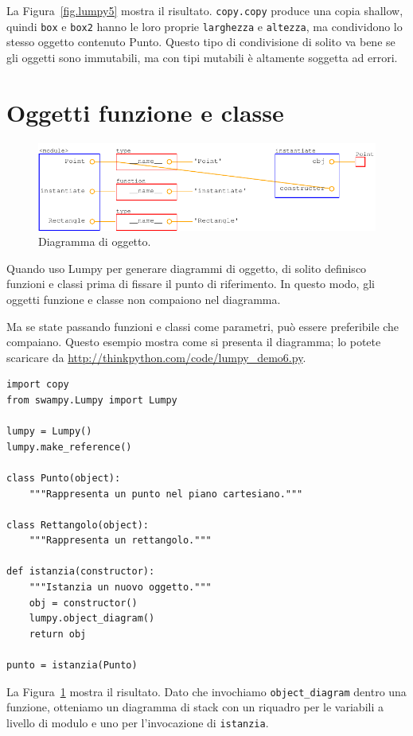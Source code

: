 \documentclass[10pt]{book}
\begin{document}
La Figura~\ref{fig.lumpy5} mostra il risultato.  {\tt copy.copy} produce una copia shallow, quindi {\tt box} e {\tt box2} hanno le loro proprie {\tt larghezza} e {\tt altezza}, ma condividono lo stesso oggetto contenuto Punto. Questo tipo di condivisione di solito va bene se gli oggetti sono immutabili, ma con tipi mutabili è altamente soggetta ad errori.

\section{Oggetti funzione e classe}

\begin{figure}
\centerline
{\includegraphics[scale=0.7]{figs/lumpydemo6.pdf}}
\caption{Diagramma di oggetto.}
\label{fig.lumpy6}
\end{figure}

Quando uso Lumpy per generare diagrammi di oggetto, di solito definisco funzioni e classi prima di fissare il punto di riferimento. In questo modo, gli oggetti funzione e classe non compaiono nel diagramma.

Ma se state passando funzioni e classi come parametri, può essere preferibile che compaiano. Questo esempio mostra come si presenta il diagramma; lo potete scaricare da
\url{http://thinkpython.com/code/lumpy_demo6.py}.

\begin{verbatim}
import copy
from swampy.Lumpy import Lumpy

lumpy = Lumpy()
lumpy.make_reference()

class Punto(object):
    """Rappresenta un punto nel piano cartesiano."""

class Rettangolo(object):
    """Rappresenta un rettangolo."""

def istanzia(constructor):
    """Istanzia un nuovo oggetto."""
    obj = constructor()
    lumpy.object_diagram()
    return obj

punto = istanzia(Punto)
\end{verbatim}

La Figura~\ref{fig.lumpy6} mostra il risultato. Dato che invochiamo
\verb"object_diagram" dentro una funzione, otteniamo un diagramma di stack con un riquadro per le variabili a livello di modulo e uno per l'invocazione di
{\tt istanzia}.
\end{document}
